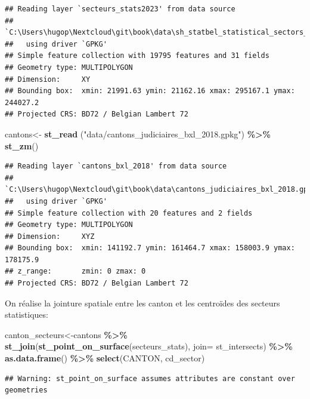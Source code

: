 \documentclass[
]{book}
\newenvironment{Shaded}{\begin{snugshade}}{\end{snugshade}}
\newcommand{\AttributeTok}[1]{\textcolor[rgb]{0.13,0.29,0.53}{#1}}
\newcommand{\FunctionTok}[1]{\textcolor[rgb]{0.13,0.29,0.53}{\textbf{#1}}}
\newcommand{\NormalTok}[1]{#1}
\newcommand{\OtherTok}[1]{\textcolor[rgb]{0.56,0.35,0.01}{#1}}
\newcommand{\SpecialCharTok}[1]{\textcolor[rgb]{0.81,0.36,0.00}{\textbf{#1}}}
\newcommand{\StringTok}[1]{\textcolor[rgb]{0.31,0.60,0.02}{#1}}
\begin{document}
\begin{verbatim}
## Reading layer `secteurs_stats2023' from data source 
##   `C:\Users\hugop\Nextcloud\git\book\data\sh_statbel_statistical_sectors_31370_20230101.gpkg' 
##   using driver `GPKG'
## Simple feature collection with 19795 features and 31 fields
## Geometry type: MULTIPOLYGON
## Dimension:     XY
## Bounding box:  xmin: 21991.63 ymin: 21162.16 xmax: 295167.1 ymax: 244027.2
## Projected CRS: BD72 / Belgian Lambert 72
\end{verbatim}

\begin{Shaded}
\begin{Highlighting}[]
\NormalTok{cantons}\OtherTok{\textless{}{-}} \FunctionTok{st\_read}\NormalTok{ (}\StringTok{"data/cantons\_judiciaires\_bxl\_2018.gpkg"}\NormalTok{) }\SpecialCharTok{\%\textgreater{}\%}
  \FunctionTok{st\_zm}\NormalTok{()}
\end{Highlighting}
\end{Shaded}

\begin{verbatim}
## Reading layer `cantons_bxl_2018' from data source 
##   `C:\Users\hugop\Nextcloud\git\book\data\cantons_judiciaires_bxl_2018.gpkg' 
##   using driver `GPKG'
## Simple feature collection with 20 features and 2 fields
## Geometry type: MULTIPOLYGON
## Dimension:     XYZ
## Bounding box:  xmin: 141192.7 ymin: 161464.7 xmax: 158003.9 ymax: 178175.9
## z_range:       zmin: 0 zmax: 0
## Projected CRS: BD72 / Belgian Lambert 72
\end{verbatim}

On réalise la jointure spatiale entre les canton et les centroïdes des
secteurs statistiques:

\begin{Shaded}
\begin{Highlighting}[]
\NormalTok{canton\_secteurs}\OtherTok{\textless{}{-}}\NormalTok{cantons }\SpecialCharTok{\%\textgreater{}\%}
  \FunctionTok{st\_join}\NormalTok{(}\FunctionTok{st\_point\_on\_surface}\NormalTok{(secteurs\_stats), }\AttributeTok{join=}\NormalTok{ st\_intersects) }\SpecialCharTok{\%\textgreater{}\%}
  \FunctionTok{as.data.frame}\NormalTok{() }\SpecialCharTok{\%\textgreater{}\%}
  \FunctionTok{select}\NormalTok{(CANTON, cd\_sector)}
\end{Highlighting}
\end{Shaded}

\begin{verbatim}
## Warning: st_point_on_surface assumes attributes are constant over geometries
\end{verbatim}
\end{document}
